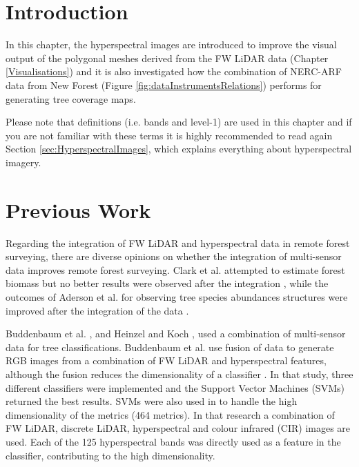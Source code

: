 \documentclass{subfiles}
\begin{document}
	
	\section{Introduction}	
	\par In this chapter, the hyperspectral images are introduced to improve the visual output of the polygonal meshes derived from the FW LiDAR data (Chapter \ref{Visualisations}) and it is also investigated how the combination of NERC-ARF data from New Forest  (Figure \ref{fig:dataInstrumentsRelations}) performs for generating tree coverage maps.
	
   {\color{blue} Please note that definitions (i.e. bands and level-1) are used in this chapter and if you are not familiar with these terms it is highly recommended to read again Section \ref{sec:HyperspectralImages}, which explains everything about hyperspectral imagery.}
	
	\section{Previous Work}
	
	\par Regarding the integration of FW LiDAR and hyperspectral data in remote forest surveying, there are diverse opinions on whether the integration of multi-sensor data improves remote forest surveying. Clark et al. attempted to estimate forest biomass but no better results were observed after the integration \cite{Clark2011}, while the outcomes of Aderson et al. for observing tree species abundances structures were improved after the integration of the data \cite{Anderson2008}. 
	
	\par  Buddenbaum et al. \cite{Buddenbaum2013}, and Heinzel and Koch \cite{Heinzel2012}, used a combination of multi-sensor data for tree classifications. Buddenbaum et al. use fusion of data to generate RGB images from a combination of FW LiDAR and hyperspectral features, although the fusion reduces the dimensionality of a classifier \cite{Buddenbaum2013}. In that study, three different classifiers were implemented and the Support Vector Machines (SVMs) returned the best results. SVMs were also used in \cite{Heinzel2012} to handle the high dimensionality of the metrics (464 metrics). In that research a combination of FW LiDAR, discrete LiDAR, hyperspectral and colour infrared (CIR) images are used. Each of the 125 hyperspectral bands was directly used as a feature in the classifier, contributing to the high dimensionality. 
 
\end{document}
